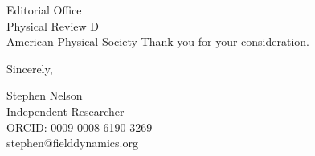 \documentclass[11pt]{letter}
\begin{document}
\begin{letter}{Editorial Office\\Physical Review D\\American Physical Society}
Thank you for your consideration.

\closing{Sincerely,}

Stephen Nelson\\
Independent Researcher\\
ORCID: 0009-0008-6190-3269\\
stephen@fielddynamics.org

\end{letter}
\end{document}
